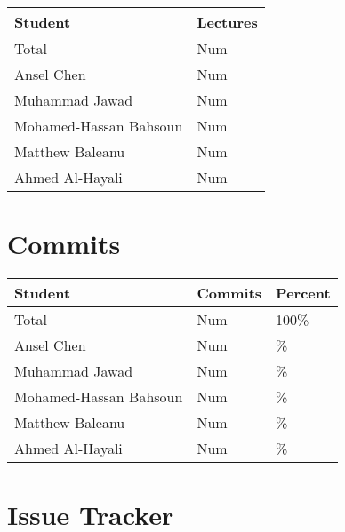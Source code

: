 \documentclass{article}
\begin{document}
\begin{table}[H]
\centering
\begin{tabular}{ll}
\toprule
\textbf{Student} & \textbf{Lectures}\\
\midrule
Total & Num\\
Ansel Chen & Num\\
Muhammad Jawad & Num\\
Mohamed-Hassan Bahsoun & Num\\
Matthew Baleanu & Num\\
Ahmed Al-Hayali & Num\\
\bottomrule
\end{tabular}
\end{table}


\section{Commits}


\begin{table}[H]
\centering
\begin{tabular}{lll}
\toprule
\textbf{Student} & \textbf{Commits} & \textbf{Percent}\\
\midrule
Total & Num & 100\% \\
Ansel Chen & Num & \% \\
Muhammad Jawad & Num & \% \\
Mohamed-Hassan Bahsoun & Num & \% \\
Matthew Baleanu & Num & \% \\
Ahmed Al-Hayali & Num & \% \\
\bottomrule
\end{tabular}
\end{table}


\section{Issue Tracker}
\end{document}
